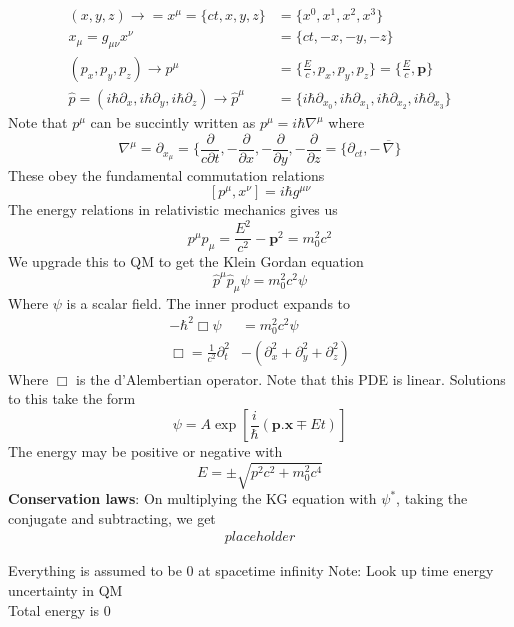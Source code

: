 \documentclass{article}
\newcommand{\note}[1]{\color{blue} Note: #1 \color{black}}
\newcommand{\olsi}[1]{\,\overline{\!{#1}}} %
\begin{document}
\begin{align*}
    (x,y,z) \to = x^\mu = \{ ct, x,y,z \} &= \{x^0, x^1 ,x^2,x^3 \} \\
     x_\mu = g_{\mu \nu} x^\nu &= \{ct, -x, -y, -z \}\\
    (p_x,p_y,p_z)\to p^\mu &= \{\frac{E}{c}, p_x, p_y, p_z \} = \{\frac{E}{c}, \mathbf{p} \}\\
    \hat{p} = (i\hbar \partial_x, i\hbar \partial_y, i\hbar \partial_z ) \to \hat{p}^\mu &=  \{ i\hbar \partial_{x_0}, i\hbar \partial_{x_1}, i\hbar \partial_{x_2}, i\hbar \partial_{x_3} \}
\end{align*}
Note that \(p^\mu\) can be succintly written as \(p^\mu = i\hbar \nabla^\mu  \) where
\begin{equation*}
    \nabla ^\mu = \partial_{x_\mu} = \{\frac{\partial}{c\partial t},-\frac{\partial}{\partial x},-\frac{\partial }{\partial y},-\frac{\partial}{\partial z} = \{\partial_{ct}, - \olsi{\nabla}   \}
\end{equation*} 
These obey the fundamental commutation relations 
\begin{equation*}
    \left[ p^\mu , x^\nu  \right] = i\hbar g^{\mu\nu}
\end{equation*}
The energy relations in relativistic mechanics gives us 
\begin{equation*}
    p^\mu p_\mu = \frac{E^2}{c^2} - \mathbf{p}^2 = m_0^2 c^2 
\end{equation*}
We upgrade this to QM to get the Klein Gordan equation 
\begin{equation*}
    \hat{p}^\mu\hat{p}_\mu \psi = m_0^2c^2 \psi
\end{equation*}
Where \(\psi\) is a scalar field. The inner product expands to 
\begin{align*}
    -\hbar^2 \Box \psi &= m_0^2c^2 \psi \\
    \Box = \frac{1}{c^2} \partial_t^2 &- \left(\partial_x^2 + \partial_y^2 + \partial_z^2\right)
\end{align*}
Where \(\Box\) is the d'Alembertian operator. Note that this PDE is linear. Solutions to this take the form 
\begin{equation*}
    \psi = A\exp\left[ \frac{i}{\hbar}\left(\mathbf{p.x} \mp Et \right) \right]
\end{equation*}
The energy may be positive or negative with
\begin{equation*}
    E = \pm \sqrt{p^2c^2 + m_0^2c^4}
\end{equation*}
\textbf{Conservation laws}: 
On multiplying the KG equation with \(\psi^*\), taking the conjugate and subtracting, we get 
\begin{align*}
placeholder
\end{align*}

Everything is assumed to be 0 at spacetime infinity
\note{Look up time energy uncertainty in QM} \\
Total energy is 0
\end{document}
